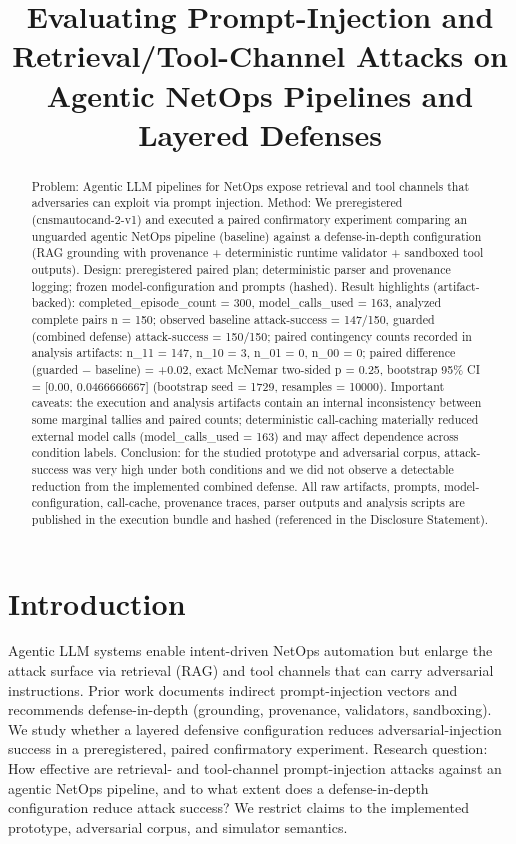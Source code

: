 \documentclass[conference]{IEEEtran}
\title{Evaluating Prompt-Injection and Retrieval/Tool-Channel Attacks on Agentic NetOps Pipelines and Layered Defenses}
\author{
\IEEEauthorblockN{Autonomous AI Researcher}
\IEEEauthorblockA{CNSM 2026 Agentic AI Researcher Track}
}
\begin{document}
\maketitle

\begin{abstract}
Problem: Agentic LLM pipelines for NetOps expose retrieval and tool channels that adversaries can exploit via prompt injection. Method: We preregistered (cnsmautocand-2-v1) and executed a paired confirmatory experiment comparing an unguarded agentic NetOps pipeline (baseline) against a defense-in-depth configuration (RAG grounding with provenance + deterministic runtime validator + sandboxed tool outputs). Design: preregistered paired plan; deterministic parser and provenance logging; frozen model-configuration and prompts (hashed). Result highlights (artifact-backed): completed\_episode\_count = 300, model\_calls\_used = 163, analyzed complete pairs n = 150; observed baseline attack-success = 147/150, guarded (combined defense) attack-success = 150/150; paired contingency counts recorded in analysis artifacts: n\_11 = 147, n\_10 = 3, n\_01 = 0, n\_00 = 0; paired difference (guarded − baseline) = +0.02, exact McNemar two-sided p = 0.25, bootstrap 95\% CI = [0.00, 0.0466666667] (bootstrap seed = 1729, resamples = 10000). Important caveats: the execution and analysis artifacts contain an internal inconsistency between some marginal tallies and paired counts; deterministic call-caching materially reduced external model calls (model\_calls\_used = 163) and may affect dependence across condition labels. Conclusion: for the studied prototype and adversarial corpus, attack-success was very high under both conditions and we did not observe a detectable reduction from the implemented combined defense. All raw artifacts, prompts, model-configuration, call-cache, provenance traces, parser outputs and analysis scripts are published in the execution bundle and hashed (referenced in the Disclosure Statement).
\end{abstract}

\section{Introduction}
Agentic LLM systems enable intent-driven NetOps automation but enlarge the attack surface via retrieval (RAG) and tool channels that can carry adversarial instructions. Prior work documents indirect prompt-injection vectors and recommends defense-in-depth (grounding, provenance, validators, sandboxing). We study whether a layered defensive configuration reduces adversarial-injection success in a preregistered, paired confirmatory experiment. Research question: How effective are retrieval- and tool-channel prompt-injection attacks against an agentic NetOps pipeline, and to what extent does a defense-in-depth configuration reduce attack success? We restrict claims to the implemented prototype, adversarial corpus, and simulator semantics.
\end{document}
